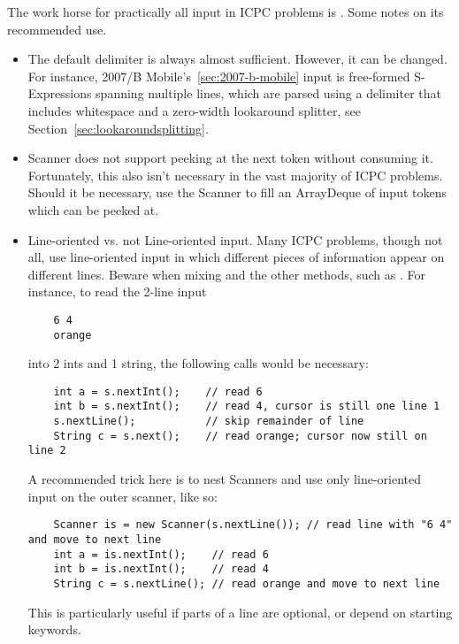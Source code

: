 The work horse for practically all input in ICPC problems is .  
Some notes on its recommended use.

\begin{itemize}
\item The default delimiter is always almost sufficient.  However, it can be changed.
    For instance, 2007/B Mobile's~\ref{sec:2007-b-mobile} input is free-formed S-Expressions
    spanning multiple lines, which are parsed using a delimiter that includes whitespace and
    a zero-width lookaround splitter, see Section~\ref{sec:lookaroundsplitting}.

\item Scanner does not support peeking at the next token without consuming it.
    Fortunately, this also isn't necessary in the vast majority of ICPC problems.  
    Should it be necessary, use the Scanner to fill an ArrayDeque of input tokens which
    can be peeked at.

\item Line-oriented vs. not Line-oriented input.  Many ICPC problems, though not all, use
    line-oriented input in which different pieces of information appear on different lines.
    Beware when mixing  and the other  methods, such as .
    For instance, to read the 2-line input
    \begin{verbatim}
    6 4
    orange
    \end{verbatim}
    into 2 ints and 1 string, the following calls would be necessary:
\begin{verbatim}
    int a = s.nextInt();    // read 6
    int b = s.nextInt();    // read 4, cursor is still one line 1
    s.nextLine();           // skip remainder of line
    String c = s.next();    // read orange; cursor now still on line 2
\end{verbatim}
    A recommended trick here is to nest Scanners and use only line-oriented 
    input on the outer scanner, like so:
\begin{verbatim}
    Scanner is = new Scanner(s.nextLine()); // read line with "6 4" and move to next line
    int a = is.nextInt();    // read 6
    int b = is.nextInt();    // read 4
    String c = s.nextLine(); // read orange and move to next line
\end{verbatim}
    This is particularly useful if parts of a line are optional, or depend on starting keywords.

\end{itemize}
